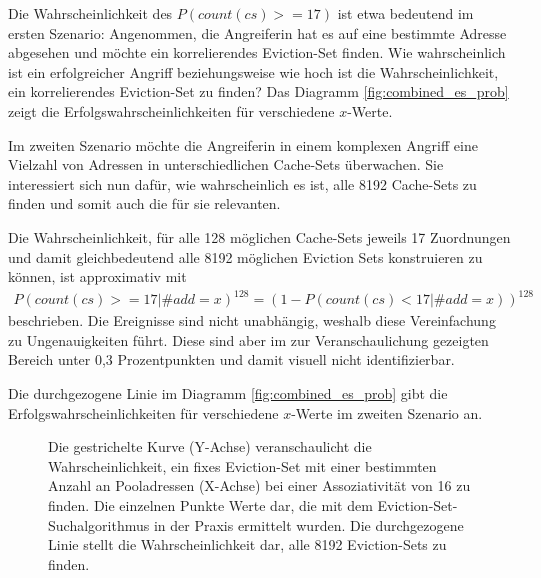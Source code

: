 Die Wahrscheinlichkeit des $P(count(cs)>=17)$ ist etwa bedeutend im ersten Szenario:
Angenommen, die Angreiferin hat es auf eine bestimmte Adresse abgesehen und möchte ein korrelierendes Eviction-Set finden. 
Wie wahrscheinlich ist ein erfolgreicher Angriff beziehungsweise wie hoch ist die Wahrscheinlichkeit, ein korrelierendes Eviction-Set zu finden? 
Das Diagramm \ref{fig:combined_es_prob} zeigt die Erfolgswahrscheinlichkeiten für verschiedene $x$-Werte. 


Im zweiten Szenario möchte die Angreiferin in einem komplexen Angriff eine Vielzahl von Adressen in unterschiedlichen Cache-Sets überwachen. 
Sie interessiert sich nun dafür, wie wahrscheinlich es ist, alle 8192 Cache-Sets zu finden und somit auch die für sie relevanten. 

Die Wahrscheinlichkeit, für alle 128 möglichen Cache-Sets jeweils 17 Zuordnungen und damit gleichbedeutend alle 8192 möglichen Eviction Sets konstruieren zu können, ist approximativ mit
\begin{align*}
P(count(cs)>=17|\#add = x)^{128} = (1-P(count(cs)<17|\#add = x))^{128}
\end{align*}
beschrieben.
Die Ereignisse sind nicht unabhängig, weshalb diese Vereinfachung zu Ungenauigkeiten führt.
Diese sind aber im zur Veranschaulichung gezeigten Bereich unter 0,3 Prozentpunkten und damit visuell nicht identifizierbar.

Die durchgezogene Linie im Diagramm \ref{fig:combined_es_prob} gibt die Erfolgswahrscheinlichkeiten für verschiedene $x$-Werte im zweiten Szenario an. 


\label{fig:combined_es_prob}
\begin{figure}[h]
\centering
\begin{scaletikzpicturetowidth}{\textwidth}

\end{scaletikzpicturetowidth}
\caption{Die gestrichelte Kurve (Y-Achse) veranschaulicht die Wahrscheinlichkeit, ein fixes Eviction-Set mit einer bestimmten Anzahl an Pooladressen (X-Achse) bei einer Assoziativität von 16 zu finden. Die einzelnen Punkte Werte dar, die mit dem Eviction-Set-Suchalgorithmus in der Praxis ermittelt wurden.
Die durchgezogene Linie stellt die Wahrscheinlichkeit dar, alle 8192 Eviction-Sets zu finden.}
\end{figure}

